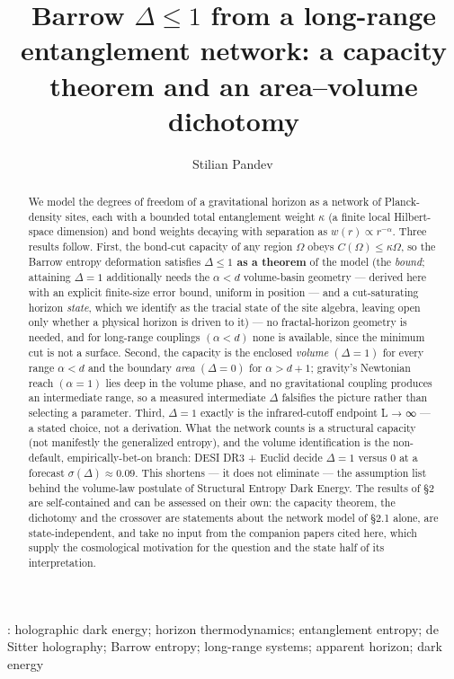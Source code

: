 \documentclass[12pt]{iopart}
\begin{document}
\title[Barrow $\Delta \le 1$ from a long-range entanglement network]{Barrow
\(\Delta  \leq  1\) from a long-range entanglement network: a capacity
theorem and an area--volume dichotomy}
\author{Stilian Pandev\,}
\address{Independent researcher}
\begin{abstract}We model the degrees of freedom of a gravitational
horizon as a network of Planck-density sites, each with a bounded total
entanglement weight \(\kappa\) (a finite local Hilbert-space dimension)
and bond weights decaying with separation as
\(w(r) \propto  r^{-\alpha }\). Three results follow. First, the
bond-cut capacity of any region \(\Omega\) obeys
\(C(\Omega ) \leq  \kappa\)\textbar{}\(\Omega\)\textbar, so the Barrow
entropy deformation satisfies \textbf{\(\Delta  \leq  1\) as a theorem}
of the model (the \emph{bound}; attaining \(\Delta  = 1\) additionally
needs the \(\alpha  < d\) volume-basin geometry --- derived here with an
explicit finite-size error bound, uniform in position --- and a
cut-saturating horizon \emph{state}, which we identify as the tracial
state of the site algebra, leaving open only whether a physical horizon
is driven to it) --- no fractal-horizon geometry is needed, and for
long-range couplings \((\alpha  < d)\) none is available, since the
minimum cut is not a surface. Second, the capacity is the enclosed
\emph{volume} \((\Delta  = 1)\) for every range \(\alpha  < d\) and the
boundary \emph{area} \((\Delta  = 0)\) for \(\alpha  > d + 1\);
gravity's Newtonian reach \((\alpha  = 1)\) lies deep in the volume
phase, and no gravitational coupling produces an intermediate range, so
a measured intermediate \(\Delta\) falsifies the picture rather than
selecting a parameter. Third, \(\Delta  = 1\) exactly is the
infrared-cutoff endpoint L → ∞ --- a stated choice, not a derivation.
What the network counts is a structural capacity (not manifestly the
generalized entropy), and the volume identification is the non-default,
empirically-bet-on branch: DESI DR3 + Euclid decide \(\Delta  = 1\)
versus 0 at a forecast \(\sigma (\Delta ) \approx  0.09\). This shortens
--- it does not eliminate --- the assumption list behind the volume-law
postulate of Structural Entropy Dark Energy. The results of §2 are
self-contained and can be assessed on their own: the capacity theorem,
the dichotomy and the crossover are statements about the network model
of §2.1 alone, are state-independent, and take no input from the
companion papers cited here, which supply the cosmological motivation
for the question and the state half of its interpretation.\end{abstract}
\vspace{1pc}: holographic dark energy; horizon
thermodynamics; entanglement entropy; de Sitter holography; Barrow
entropy; long-range systems; apparent horizon; dark energy
\maketitle
\end{document}

